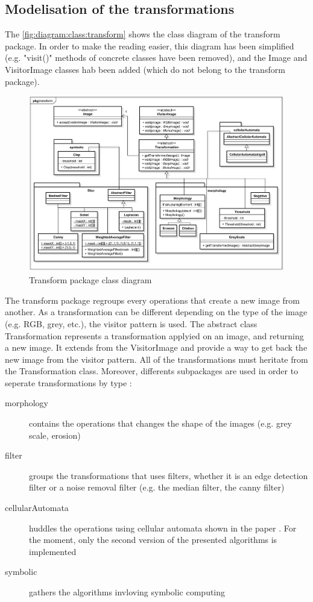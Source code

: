 \subsection{Modelisation of the transformations}


The \vref{fig:diagram:class:transform} shows the class diagram of the transform package. In order to make the reading easier, this diagram has been simplified (e.g. "visit()" methods of concrete classes have been removed), and the Image and VisitorImage classes hab been added (which do not belong to the transform package). 

\begin{figure}[H]
	\centering
	\includegraphics[width=1\textwidth]{images/diagrams/class_diagram_transform}
	\caption{Transform package class diagram}
	\label{fig:diagram:class:transform}
\end{figure}


The transform package regroups every operations that create a new image from another. As a transformation can be different depending on the type of the image (e.g. RGB, grey, etc.), the visitor pattern is used. The abstract class Transformation represents a transformation applyied on an image, and returning a new image. It extends from the VisitorImage and provide a way to get back the new image from the visitor pattern. All of the transformations must heritate from the Transformation class. Moreover, differents subpackages are used in order to seperate transformations by type : 
\begin{description}
	\item[morphology] contains the operations that changes the shape of the images (e.g. grey scale, erosion)
	\item[filter] groups the transformations that uses filters, whether it is an edge detection filter or a noise removal filter (e.g. the median filter, the canny filter)
	\item[cellularAutomata] huddles the operations using cellular automata shown in the paper \cite{bib:filter:CA}. For the moment, only the second version of the presented algorithms is implemented
	\item[symbolic] gathers the algorithms invloving symbolic computing
\end{description}






